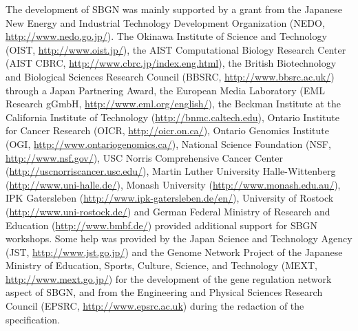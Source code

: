 The development of SBGN was mainly supported by a grant from the Japanese New Energy and Industrial Technology Development Organization (NEDO, \url{http://www.nedo.go.jp/}). 
The Okinawa Institute of Science and Technology (OIST, \url{http://www.oist.jp/}), 
the AIST Computational Biology Research Center (AIST CBRC, \url{http://www.cbrc.jp/index.eng.html}), 
the British Biotechnology and Biological Sciences Research Council (BBSRC, \url{http://www.bbsrc.ac.uk/}) through a Japan Partnering Award, 
the European Media Laboratory (EML Research gGmbH, \url{http://www.eml.org/english/}), 
the Beckman Institute at the California Institute of Technology (\url{http://bnmc.caltech.edu}), 
Ontario Institute for Cancer Research (OICR, \url{http://oicr.on.ca/}), 
Ontario Genomics Institute (OGI, \url{http://www.ontariogenomics.ca/}), 
National Science Foundation (NSF, \url{http://www.nsf.gov/}), 
USC Norris Comprehensive Cancer Center (\url{http://uscnorriscancer.usc.edu/}), 
Martin Luther University Halle-Wittenberg (\url{http://www.uni-halle.de/}), 
Monash University (\url{http://www.monash.edu.au/}), 
IPK Gatersleben (\url{http://www.ipk-gatersleben.de/en/}), 
University of Rostock (\url{http://www.uni-rostock.de/})  and 
German Federal Ministry of Research and Education (\url{http://www.bmbf.de/}) provided additional support for SBGN workshops. 
Some help was provided by the Japan Science and Technology Agency (JST, \url{http://www.jst.go.jp/}) and the Genome Network Project of the Japanese Ministry of Education, Sports, Culture, Science, and Technology (MEXT, \url{http://www.mext.go.jp/}) for the development of the gene regulation network aspect of SBGN, and from the Engineering and Physical Sciences Research Council (EPSRC, \url{http://www.epsrc.ac.uk}) during the redaction of the specification.

